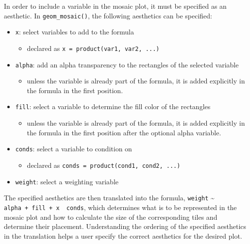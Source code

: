 In order to include a variable in the mosaic plot, it must be specified as an aesthetic. In \texttt{geom\_mosaic()}, the following aesthetics can be specified:

\begin{itemize}
\item
  \texttt{x}: select variables to add to the formula

  \begin{itemize}
  \tightlist
  \item
    declared as \texttt{x\ =\ product(var1,\ var2,\ ...)}
  \end{itemize}
\item
  \texttt{alpha}: add an alpha transparency to the rectangles of the selected variable

  \begin{itemize}
  \tightlist
  \item
    unless the variable is already part of the formula, it is added explicitly in the formula in the first position.
  \end{itemize}
\item
  \texttt{fill}: select a variable to determine the fill color of the rectangles

  \begin{itemize}
  \tightlist
  \item
    unless the variable is already part of the formula, it is added explicitly in the formula in the first position after the optional alpha variable.
  \end{itemize}
\item
  \texttt{conds}: select a variable to condition on

  \begin{itemize}
  \tightlist
  \item
    declared as \texttt{conds\ =\ product(cond1,\ cond2,\ ...)}
  \end{itemize}
\item
  \texttt{weight}: select a weighting variable
\end{itemize}

The specified aesthetics are then translated into the formula, \texttt{weight} \textasciitilde{} \texttt{alpha\ +\ fill\ +\ x\ \textbar{}\ conds}, which determines what is to be represented in the mosaic plot and how to calculate the size of the corresponding tiles and determine their placement. Understanding the ordering of the specified aesthetics in the translation helps a user specify the correct aesthetics for the desired plot.

